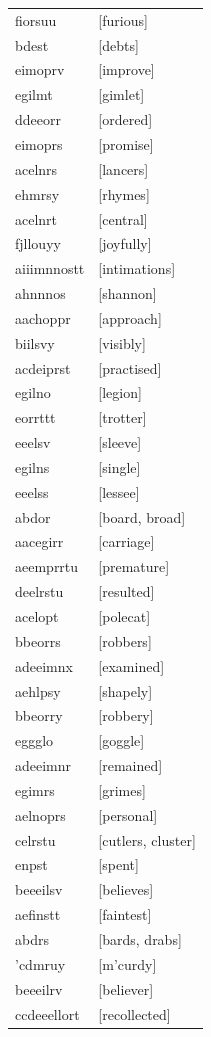 \documentclass{article}
\begin{document}
\begin{tabular}{ll}
fiorsuu & [furious] \\
bdest & [debts] \\
eimoprv & [improve] \\
egilmt & [gimlet] \\
ddeeorr & [ordered] \\
eimoprs & [promise] \\
acelnrs & [lancers] \\
ehmrsy & [rhymes] \\
acelnrt & [central] \\
fjllouyy & [joyfully] \\
aiiimnnostt & [intimations] \\
ahnnnos & [shannon] \\
aachoppr & [approach] \\
biilsvy & [visibly] \\
acdeiprst & [practised] \\
egilno & [legion] \\
eorrttt & [trotter] \\
eeelsv & [sleeve] \\
egilns & [single] \\
eeelss & [lessee] \\
abdor & [board, broad] \\
aacegirr & [carriage] \\
aeemprrtu & [premature] \\
deelrstu & [resulted] \\
acelopt & [polecat] \\
bbeorrs & [robbers] \\
adeeimnx & [examined] \\
aehlpsy & [shapely] \\
bbeorry & [robbery] \\
eggglo & [goggle] \\
adeeimnr & [remained] \\
egimrs & [grimes] \\
aelnoprs & [personal] \\
celrstu & [cutlers, cluster] \\
enpst & [spent] \\
beeeilsv & [believes] \\
aefinstt & [faintest] \\
abdrs & [bards, drabs] \\
'cdmruy & [m'curdy] \\
beeeilrv & [believer] \\
ccdeeellort & [recollected] \\

\end{tabular}
\end{document}
